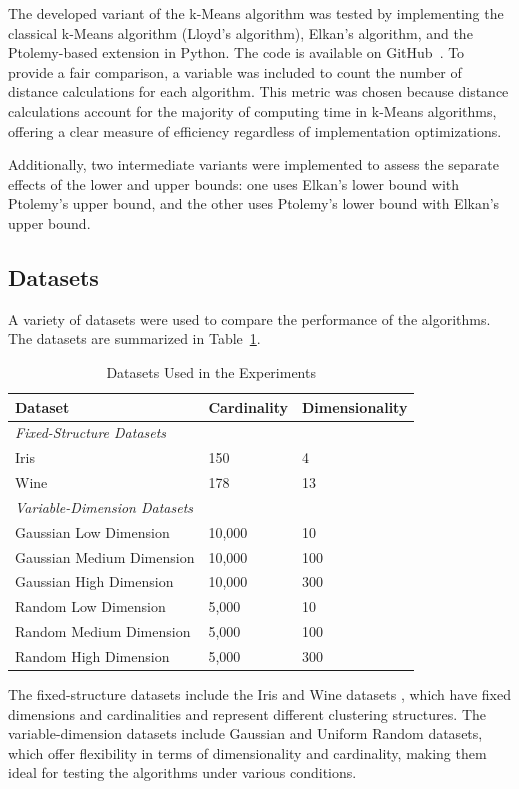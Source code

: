 The developed variant of the k-Means algorithm was tested by implementing the classical k-Means algorithm (Lloyd's algorithm), Elkan's algorithm, and the Ptolemy-based extension in Python. The code is available on GitHub~\cite{Averitchev2024kMeansPtolemy}. To provide a fair comparison, a variable was included to count the number of distance calculations for each algorithm. This metric was chosen because distance calculations account for the majority of computing time in k-Means algorithms, offering a clear measure of efficiency regardless of implementation optimizations.

Additionally, two intermediate variants were implemented to assess the separate effects of the lower and upper bounds: one uses Elkan's lower bound with Ptolemy's upper bound, and the other uses Ptolemy's lower bound with Elkan's upper bound. 

\subsection{Datasets}

A variety of datasets were used to compare the performance of the algorithms. The datasets are summarized in Table~\ref{tab:datasets}. 
\begin{table}[htbp]
\centering
\caption{Datasets Used in the Experiments}
\label{tab:datasets}
\begin{tabular}{lll}
\hline
\textbf{Dataset} & \textbf{Cardinality} & \textbf{Dimensionality} \\
\hline
\multicolumn{3}{l}{\textit{Fixed-Structure Datasets}} \\
Iris & 150 & 4 \\
Wine & 178 & 13 \\
\hline
\multicolumn{3}{l}{\textit{Variable-Dimension Datasets}} \\
Gaussian Low Dimension & 10,000 & 10 \\
Gaussian Medium Dimension & 10,000 & 100 \\
Gaussian High Dimension & 10,000 & 300 \\
Random Low Dimension & 5,000 & 10 \\
Random Medium Dimension & 5,000 & 100 \\
Random High Dimension & 5,000 & 300 \\
\hline
\end{tabular}
\end{table}

The fixed-structure datasets include the Iris and Wine datasets \cite{pedregosa2011scikit}, which have fixed dimensions and cardinalities and represent different clustering structures. The variable-dimension datasets include Gaussian and Uniform Random datasets, which offer flexibility in terms of dimensionality and cardinality, making them ideal for testing the algorithms under various conditions.

